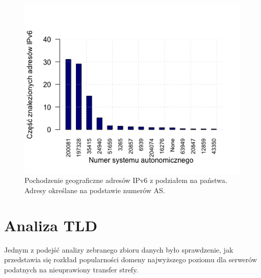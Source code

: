 \begin{figure}[h]
	\centering
	\includegraphics[width=1.0\textwidth]{image/Ipv6_as_count_no_title}
	\caption{Pochodzenie geograficzne adresów IPv6 z podziałem na państwa. Adresy określane na podstawie numerów AS.}
	\label{fig:ipv6_co}
\end{figure}

\section{Analiza TLD}
\noindent Jednym z podejść analizy zebranego zbioru danych było sprawdzenie, jak przedstawia się rozkład popularności domeny najwyższego poziomu
dla serwerów podatnych na nieuprawiony transfer strefy.

